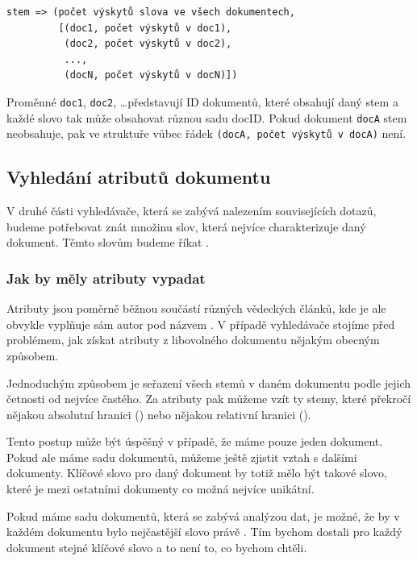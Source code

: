 \documentclass[12pt]{article}
\newcommand{\code}[1]{\texttt{#1}}
\begin{document}
\begin{verbatim}
stem => (počet výskytů slova ve všech dokumentech, 
         [(doc1, počet výskytů v doc1), 
          (doc2, počet výskytů v doc2), 
          ..., 
          (docN, počet výskytů v docN)])
\end{verbatim}

Proměnné \code{doc1}, \code{doc2}, \dots představují ID dokumentů, které obsahují daný stem a každé slovo tak může obsahovat různou sadu docID. Pokud dokument \code{docA} stem neobsahuje, pak ve struktuře vůbec řádek \code{(docA, počet výskytů v docA)} není. 

\subsection{Vyhledání atributů dokumentu} 

V druhé části vyhledávače, která se zabývá nalezením souvisejících dotazů, budeme potřebovat znát množinu slov, která nejvíce charakterizuje daný dokument. Těmto slovům budeme říkat . 

\subsubsection{Jak by měly atributy vypadat}

Atributy jsou poměrně běžnou součástí různých vědeckých článků, kde je ale obvykle vyplňuje sám autor pod názvem . V případě vyhledávače stojíme před problémem, jak získat atributy z libovolného dokumentu nějakým obecným způsobem. 

Jednoduchým způsobem je seřazení všech stemů v daném dokumentu podle jejich četnosti od nejvíce častého. Za atributy pak můžeme vzít ty stemy, které překročí nějakou absolutní hranici () nebo nějakou relativní hranici (). 

Tento postup může být úspěšný v případě, že máme pouze jeden dokument. Pokud ale máme sadu dokumentů, můžeme ještě zjistit vztah s dalšími dokumenty. Klíčové slovo pro daný dokument by totiž mělo být takové slovo, které je mezi ostatními dokumenty co možná nejvíce unikátní. 

Pokud máme sadu dokumentů, která se zabývá analýzou dat, je možné, že by v každém dokumentu bylo nejčastější slovo právě . Tím bychom dostali pro každý dokument stejné klíčové slovo a to není to, co bychom chtěli. 
\end{document}
